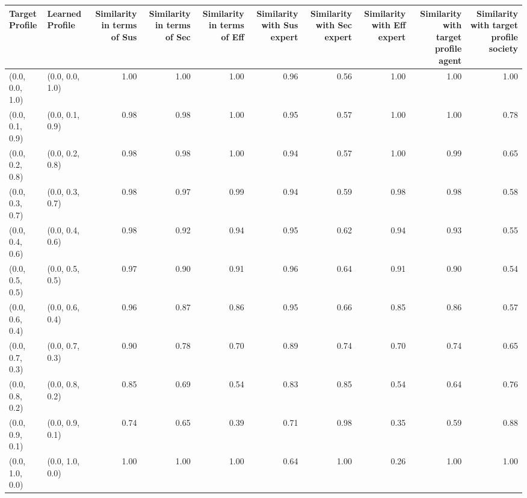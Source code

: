 \begin{tabular}{llrrrrrrrr}
\toprule
Target Profile & Learned Profile & Similarity in terms of Sus & Similarity in terms of Sec & Similarity in terms of Eff & Similarity with Sus expert & Similarity with Sec expert & Similarity with Eff expert & Similarity with target profile agent & Similarity with target profile society \\
\midrule
(0.0, 0.0, 1.0) & (0.0, 0.0, 1.0) & 1.00 & 1.00 & 1.00 & 0.96 & 0.56 & 1.00 & 1.00 & 1.00 \\
(0.0, 0.1, 0.9) & (0.0, 0.1, 0.9) & 0.98 & 0.98 & 1.00 & 0.95 & 0.57 & 1.00 & 1.00 & 0.78 \\
(0.0, 0.2, 0.8) & (0.0, 0.2, 0.8) & 0.98 & 0.98 & 1.00 & 0.94 & 0.57 & 1.00 & 0.99 & 0.65 \\
(0.0, 0.3, 0.7) & (0.0, 0.3, 0.7) & 0.98 & 0.97 & 0.99 & 0.94 & 0.59 & 0.98 & 0.98 & 0.58 \\
(0.0, 0.4, 0.6) & (0.0, 0.4, 0.6) & 0.98 & 0.92 & 0.94 & 0.95 & 0.62 & 0.94 & 0.93 & 0.55 \\
(0.0, 0.5, 0.5) & (0.0, 0.5, 0.5) & 0.97 & 0.90 & 0.91 & 0.96 & 0.64 & 0.91 & 0.90 & 0.54 \\
(0.0, 0.6, 0.4) & (0.0, 0.6, 0.4) & 0.96 & 0.87 & 0.86 & 0.95 & 0.66 & 0.85 & 0.86 & 0.57 \\
(0.0, 0.7, 0.3) & (0.0, 0.7, 0.3) & 0.90 & 0.78 & 0.70 & 0.89 & 0.74 & 0.70 & 0.74 & 0.65 \\
(0.0, 0.8, 0.2) & (0.0, 0.8, 0.2) & 0.85 & 0.69 & 0.54 & 0.83 & 0.85 & 0.54 & 0.64 & 0.76 \\
(0.0, 0.9, 0.1) & (0.0, 0.9, 0.1) & 0.74 & 0.65 & 0.39 & 0.71 & 0.98 & 0.35 & 0.59 & 0.88 \\
(0.0, 1.0, 0.0) & (0.0, 1.0, 0.0) & 1.00 & 1.00 & 1.00 & 0.64 & 1.00 & 0.26 & 1.00 & 1.00 \\
\bottomrule
\end{tabular}
